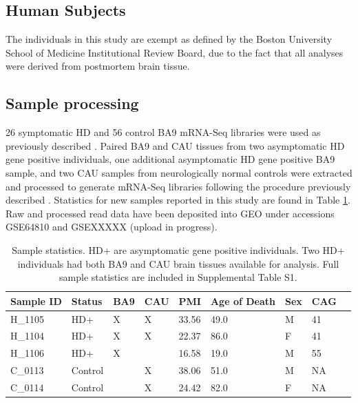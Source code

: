 \documentclass[fleqn,10pt,table]{wlscirep}
\begin{document}
\subsection{Human Subjects}
The individuals in this study are exempt as defined by the Boston University School of Medicine Institutional Review Board, due to the fact that all analyses were derived from postmortem brain tissue.

\subsection{Sample processing}
26 symptomatic HD and 56 control BA9 mRNA-Seq libraries were used as previously described \cite{Labadorf2017-qb}.
Paired BA9 and CAU tissues from two asymptomatic HD gene positive individuals, one additional asymptomatic HD gene positive BA9 sample, and two CAU samples from neurologically normal controls were extracted and processed to generate mRNA-Seq libraries following the procedure previously described \cite{Labadorf2017-qb}.
Statistics for new samples reported in this study are found in Table \ref{tab:asymp_samples}.
Raw and processed read data have been deposited into GEO under accessions GSE64810 and GSEXXXXX (upload in progress).

\begin{table}[ht]
\centering
{}
\begin{tabular}{|l|l|l|l|l|l|l|l|l|}
\hline
Sample ID & Status  & BA9 & CAU & PMI   & Age of Death & Sex & CAG  \\ \hline
H\_1105   & HD+      & X   & X   & 33.56 & 49.0         & M  & 41   \\
H\_1104   & HD+      & X   & X   & 22.37 & 86.0         & F  & 41   \\
H\_1106   & HD+      & X   &     & 16.58 & 19.0         & M  & 55   \\
C\_0113   & Control  &     & X   & 38.06 & 51.0         & M  & NA   \\
C\_0114   & Control  &     & X   & 24.42 & 82.0         & F  & NA   \\ \hline
\end{tabular}
\caption{Sample statistics. HD+ are asymptomatic gene positive individuals. Two HD+ individuals had both BA9 and CAU brain tissues available for analysis. Full sample statistics are included in Supplemental Table S1. \label{tab:asymp_samples}}
\end{table}
\end{document}
